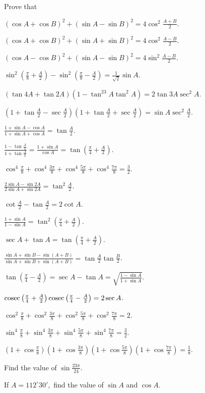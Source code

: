 Prove that

\item $(\cos A + \cos B)^2 + (\sin A - \sin B)^2 = 4\cos^2 \frac{A + B}{2}$.
\item $(\cos A + \cos B)^2 + (\sin A + \sin B)^2 = 4\cos^2 \frac{A - B}{2}$.
\item $(\cos A - \cos B)^2 + (\sin A - \sin B)^2 = 4\sin^2 \frac{A - B}{2}$.
\item $\sin^2\left(\frac{\pi}{8} + \frac{A}{2}\right) - \sin^2\left(\frac{\pi}{8} -\frac{A}{2}\right) = \frac{1}{\sqrt{2}}\sin
  A$.
\item $(\tan 4A + \tan 2A)(1 - \tan^23A\tan^2A) = 2\tan 3A\sec^2A$.
\item $\left(1 + \tan \frac{A}{2} - \sec\frac{A}{2}\right)\left(1 + \tan \frac{A}{2} + \sec\frac{A}{2}\right) = \sin
  A\sec^2\frac{A}{2}$.
\item $\frac{1 + \sin A - \cos A}{1 + \sin A + \cos A} = \tan \frac{A}{2}$.
\item $\frac{1 - \tan \frac{A}{2}}{1 + \tan \frac{A}{2}} = \frac{1 + \sin A}{\cos A} = \tan \left(\frac{\pi}{4} +
  \frac{A}{2}\right)$.
\item $\cos^4\frac{\pi}{8} + \cos^4 \frac{3\pi}{8} + \cos^4\frac{5\pi}{8} + \cos^4\frac{7\pi}{8}= \frac{3}{2}$.
\item $\frac{2\sin A - \sin2A}{2\sin A + \sin 2A} = \tan^2\frac{A}{2}$.
\item $\cot \frac{A}{2} - \tan \frac{A}{2} = 2\cot A$.
\item $\frac{1 + \sin A}{1 - \sin A} = \tan^2\left(\frac{\pi}{4} + \frac{A}{2}\right)$.
\item $\sec A + \tan A = \tan\left(\frac{\pi}{4} + \frac{A}{2}\right)$.
\item $\frac{\sin A + \sin B - \sin(A + B)}{\sin A + \sin B + \sin(A + B)} = \tan \frac{A}{2}\tan \frac{B}{2}$.
\item $\tan \left(\frac{\pi}{4} - \frac{A}{2}\right) = \sec A - \tan A = \sqrt{\frac{1 - \sin A}{1 + \sin A}}$.
\item ${\rm cosec}\left(\frac{\pi}{4} + \frac{A}{2}\right){\rm cosec} \left(\frac{\pi}{4} - \frac{A}{2}\right) = 2\sec A$.
\item $\cos^2\frac{\pi}{8} + \cos^2\frac{3\pi}{8} + \cos^2\frac{5\pi}{8} + \cos^2\frac{7\pi}{8} = 2$.
\item $\sin^4\frac{\pi}{8} + \sin^4 \frac{3\pi}{8} + \sin^4\frac{5\pi}{8} + \sin^4\frac{7\pi}{8} = \frac{3}{2}$.
\item $\left(1 + \cos \frac{\pi}{8}\right)\left(1 + \cos\frac{3\pi}{8}\right)\left(1 + \cos\frac{5\pi}{8}\right)\left(1 + \cos
  \frac{7\pi}{8}\right) = \frac{1}{8}$.
\item Find the value of $\sin \frac{23\pi}{24}$.
\item If $A = 112^\circ30',$ find the value of $\sin A$ and $\cos A$.
  \stopitemize

